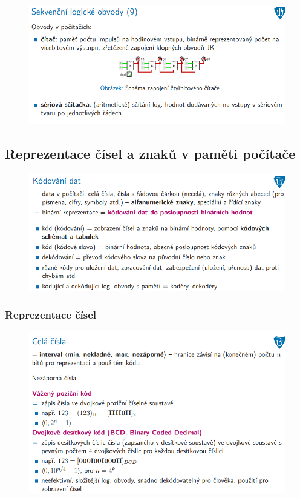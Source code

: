 \documentclass[10pt,a4paper]{article}
\begin{document}
\begin{figure} [h]
	\includegraphics[scale=0.65]{img/prvni_odstavec/otazka2/sekvencni_logicke_obvody9.png}	
\end{figure}



\clearpage
\subsection{Reprezentace čísel a znaků v paměti počítače}
\begin{figure} [h]
	\includegraphics[scale=0.65]{img/prvni_odstavec/otazka3/kodovani_cisel.png}	
\end{figure}

\clearpage
\subsubsection{Reprezentace čísel}

\begin{figure} [h]
	\includegraphics[scale=0.65]{img/prvni_odstavec/otazka3/cela_cisla1.png}	
\end{figure}
\end{document}
